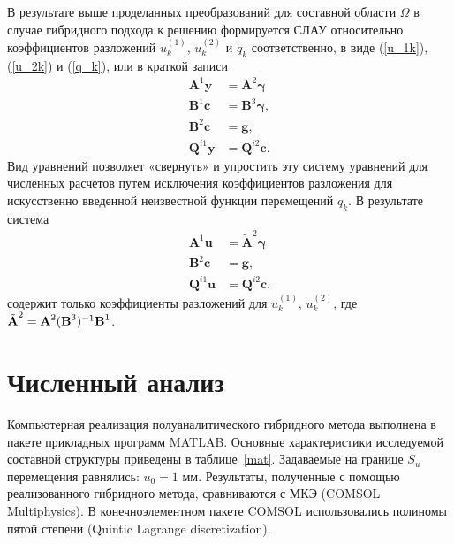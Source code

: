 \documentclass[press]{vestnik}
\begin{document}
В результате выше проделанных преобразований для составной области $\Omega$ в случае гибридного подхода к решению формируется СЛАУ относительно коэффициентов разложений  $u_{k}^{(1)}$, $u_{k}^{(2)}$ и $q_{k}$  соответственно, в виде (\ref{u_1k}), (\ref{u_2k}) и (\ref{q_k}), или в краткой записи
\begin{equation*}
	\begin{split}
		\bm{A}^{1} \bm{y} &= \bm{A}^{2} \bm{\gamma}  \\
		\bm{B}^{1} \bm{c} &= \bm{B}^{3} \bm{\gamma}, \\
		\bm{B}^{2} \bm{c} &= \bm{g}, \\
		\bm{Q}^{i1} \bm{y} &= \bm{Q}^{i2} \bm{c}.
	\end{split}
\end{equation*}
Вид уравнений позволяет «свернуть» и упростить эту систему уравнений для численных расчетов путем исключения коэффициентов разложения для искусственно введенной неизвестной функции перемещений $q_{k}$. В результате система 
\begin{equation*}
	\begin{split}
		\bm{A}^{1} \bm{u} &= \tilde{\bm{A}}^{2} \bm{\gamma} \\
		\bm{B}^{2} \bm{c} &= \bm{g}, \\
		\bm{Q}^{i1} \bm{u} &= \bm{Q}^{i2} \bm{c}.
	\end{split}
\end{equation*}
содержит только коэффициенты разложений для $u_{k}^{(1)}$, $u_{k}^{(2)}$, где $\tilde{\bm{A}}^{2} \dm = \bm{A}^{2} (\bm{B}^{3})^{-1} \bm{B}^{1}$.

\section{Численный анализ}
Компьютерная реализация полуаналитического гибридного метода выполнена в пакете прикладных программ MATLAB. Основные характеристики исследуемой составной структуры приведены в таблице~\ref{mat}. Задаваемые на границе $S_{u}$ перемещения равнялись: $u_{0}=1$ мм. Результаты, полученные с помощью реализованного гибридного метода, сравниваются с МКЭ (COMSOL Multiphysics). В конечноэлементном пакете COMSOL использовались полиномы пятой степени (Quintic Lagrange discretization).
\end{document}
